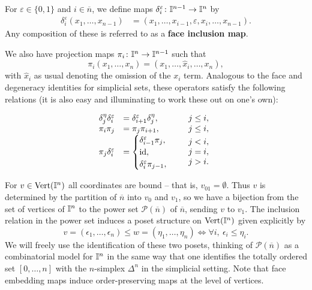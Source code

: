 For $\varepsilon \in \{0, 1\}$ and $i \in \overline{n}$, we define maps $\delta_i^\varepsilon \colon \mathbb{I}^{n-1} \to \mathbb{I}^{n}$ by
\begin{align*}
	\delta_i^\varepsilon(x_1, \dots, x_{n-1}) & = (x_1, \dots, x_{i-1}, \varepsilon, x_i, \dots, x_{n-1}).
\end{align*}
Any composition of these is referred to as a \textbf{face inclusion map}.

We also have projection maps $\pi_i \colon \mathbb{I}^n \to \mathbb{I}^{n-1}$ such that
\[\pi_i(x_1, \ldots, x_n) = (x_1, \ldots, \hat x_i, \ldots, x_n),\]
with $\hat x_i$ as usual denoting the omission of the $x_i$ term.
Analogous to the face and degeneracy identities for simplicial sets, these operators satisfy the following relations \cite[Section 4]{GrMa03} (it is also easy and illuminating to work these out on one's own):

\[
\begin{array}{rlc}
	\delta_j^\eta \delta_i^\varepsilon &= \delta_{i+1}^\varepsilon \delta_j^\eta, &j\leq i,\\
	\pi_i \pi_j &= \pi_j \pi_{i+1}, & j \leq i,\\
	\pi_j \delta^\varepsilon_i &=
	\begin{cases}
		\delta_{i-1}^\varepsilon \pi_j, \\
		\mathrm{id},\\
		\delta_i^\varepsilon \pi_{j-1},
	\end{cases}
	&\begin{array}{lll}j<i, \\ j=i, \\ j>i. \end{array}
\end{array}
\]

For $v \in {\rm Vert}(\mathbb{I}^n)$ all coordinates are bound -- that is, $v_{01} = \emptyset$.
Thus $v$ is determined by the partition of $\overline n$ into $v_0$ and $v_1$, so
we have a bijection from the set of vertices of $\mathbb{I}^n$ to the power set $\mathcal P(\overline n)$ of $\overline n$, sending $v$ to $v_1$.
The inclusion relation in the power set induces a poset structure on ${\rm Vert}(\mathbb{I}^n)$ given explicitly by
\begin{equation*}
	v = (\epsilon_1, \dots, \epsilon_n) \leq w = (\eta_1, \dots, \eta_n) \iff \forall i,\ \epsilon_i \leq \eta_i.
\end{equation*}
We will freely use the identification of these two posets, thinking of $\mathcal P(\overline n)$ as a combinatorial model for $\mathbb{I}^n$ in the same way that one identifies the totally ordered set $[0,\dots, n]$ with the $n$-simplex $\Delta^n$ in the simplicial setting.
Note that face embedding maps induce order-preserving maps at the level of vertices.

